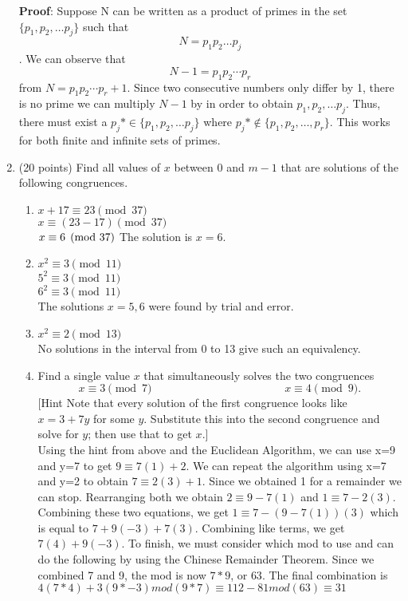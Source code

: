 \documentclass[16pt]{article}
\begin{document}
\begin{enumerate}
\textbf{Proof}: Suppose N can be written as a product of primes in the set $\{p_1,p_2,\dots p_j\}$ such that \[N=p_1p_2\dots p_j\]. We can observe that \[N-1=p_1p_2\cdots p_r\] from $N=p_1p_2\cdots p_r+1$. Since two consecutive numbers only differ by 1, there is no prime we can multiply $N-1$ by in order to obtain  $p_1,p_2,\dots p_j$. Thus, there must exist a $p_j* \in \{p_1,p_2,\dots p_j\}$ where $p_j* \not\in \{p_1,p_2,\dots, p_r\} $. This works for both finite and infinite sets of primes.

\vspace{5mm}
\item (20 points) 
Find all values of $x$ between 0 and $m-1$ that are solutions of the following congruences.
\begin{enumerate}
\item $x+17\equiv 23\pmod{37}$\\%
$x\equiv (23-17)\pmod{37}$\\
$x \equiv 6 \pmod{37}\\$
The solution is $x=6$.\\

\item $x^2\equiv 3\pmod{11}$\\%
$5^2\equiv 3\pmod{11}$\\
$6^2\equiv 3\pmod{11}$\\
The solutions $x=5,6$ were found by trial and error.\\

\item $x^2\equiv 2\pmod{13}$\\%
No solutions in the interval from 0 to 13 give such an equivalency.\\


\item Find a single value $x$ that simultaneously solves the two congruences%
\[x\equiv 3\pmod{7}\hspace{5cm} x\equiv 4\pmod{9}.\]
[Hint Note that every solution of the first congruence looks like $x=3+7y$ for some $y$.  Substitute this into the second congruence and solve for $y$; then use that to get $x$.]\\

Using the hint from above and the Euclidean Algorithm, we can use x=9 and y=7 to get $9\equiv 7(1)+2$. We can repeat the algorithm using x=7 and y=2 to obtain $7 \equiv 2(3)+1$. Since we obtained 1 for a remainder we can stop. Rearranging both we obtain $2\equiv 9-7(1)$ and $1\equiv 7-2(3)$.
Combining these two equations, we get $1\equiv 7-(9-7(1))(3)$ which is equal to $7+9(-3)+7(3)$. Combining like terms, we get $7(4)+9(-3)$. To finish, we must consider which mod to use and can do the following by using the Chinese Remainder Theorem. Since we combined 7 and 9, the mod is now $7*9$, or $63$. The final combination is
$4(7*4)+3(9*-3)mod(9*7)\equiv 112-81mod(63) \equiv 31 $

\end{enumerate}
\end{enumerate}
\end{document}
